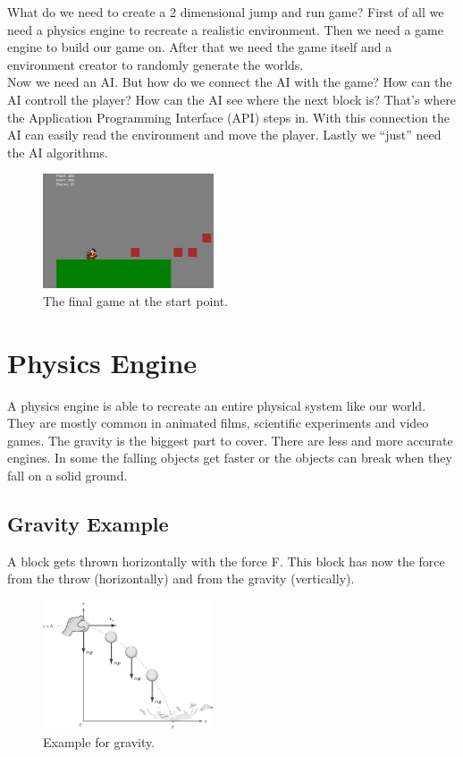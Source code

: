 What do we need to create a 2 dimensional jump and run game? First of all we need a physics engine to recreate a realistic environment. Then we need a game engine to build our game on. After that we need the game itself and a environment creator to randomly generate the worlds.\bigskip\\
Now we need an AI. But how do we connect the AI with the game? How can the AI controll the player? How can the AI see where the next block is? That's where the Application Programming Interface (API) steps in. With this connection the AI can easily read the environment and move the player. Lastly we ``just'' need the AI algorithms.

\begin{figure}[H]
  \includegraphics[width=0.45\textwidth]{images/game.png}
  \caption{The final game at the start point.}
\end{figure}
\newpage

\section{Physics Engine}
A physics engine is able to recreate an entire physical system like our world. They are mostly common in animated films, scientific experiments and video games. The gravity is the biggest part to cover. There are less and more accurate engines. In some the falling objects get faster or the objects can break when they fall on a solid ground.

\subsection{Gravity Example}
A block gets thrown horizontally with the force F. This block has now the force from the throw (horizontally) and from the gravity (vertically).\bigskip\\

\begin{figure}[H]
  \includegraphics[width=0.45\textwidth]{images/gravity_example.png}
  \caption[Gravity example from \url{http://www.sparknotes.com/testprep/books/sat2/physics/chapter7section1.rhtml}]{Example for gravity.}
\end{figure}


